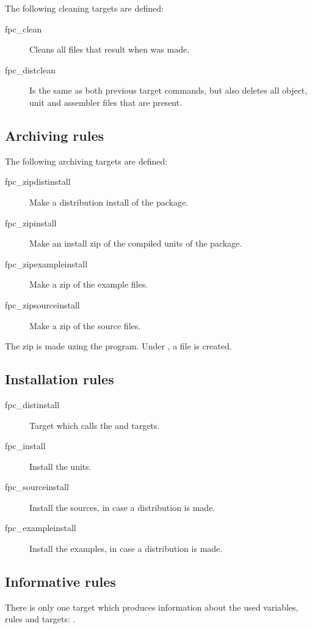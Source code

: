 The following cleaning targets are defined:
\begin{description}
\item[fpc\_clean] Cleans all files that result when  was made.
\item[fpc\_distclean] Is the same as both previous target commands, but also
deletes all object, unit and assembler files that are present.
\end{description}

\subsection{Archiving rules}

The following archiving targets are defined:
\begin{description}
\item[fpc\_zipdistinstall] Make a distribution install of the
package.
\item[fpc\_zipinstall] Make an install zip of the compiled units
of the  package.
\item[fpc\_zipexampleinstall] Make a zip of the example files.
\item[fpc\_zipsourceinstall] Make a zip of the source files.
\end{description}
The zip is made uzing the  program. Under \linux, a
 file is created.

\subsection{Installation rules}
\begin{description}
\item[fpc\_distinstall] Target which calls the  and
 targets. 
\item[fpc\_install] Install the units.
\item[fpc\_sourceinstall] Install the sources, in case a
distribution is made.
\item[fpc\_exampleinstall] Install the examples, in case
 a distribution is made.
\end{description}

\subsection{Informative rules}
There is only one target which produces information about the used
variables, rules and targets: .

